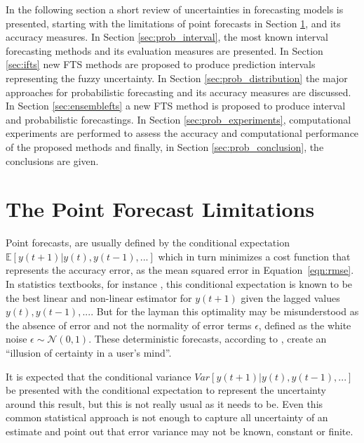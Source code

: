 In the following section a short review of uncertainties in forecasting models is presented, starting with the limitations of point forecasts in Section \ref{sec:prob_point}, and its accuracy measures. In Section \ref{sec:prob_interval}, the most known interval forecasting methods and its evaluation measures are presented. In Section \ref{sec:ifts} new FTS methods are proposed to produce prediction intervals representing the fuzzy uncertainty. In Section \ref{sec:prob_distribution} the major approaches for probabilistic forecasting and its accuracy measures are discussed. In Section \ref{sec:ensemblefts} a new FTS method is proposed to produce interval and probabilistic forecastings. In Section \ref{sec:prob_experiments}, computational experiments are performed to assess the accuracy and computational performance of the proposed methods and finally, in Section \ref{sec:prob_conclusion}, the conclusions are given. 

%
\section{The Point Forecast Limitations}
\label{sec:prob_point}


Point forecasts, are usually defined by the conditional expectation $\mathbb{E}[y(t+1)|y(t),y(t-1),...]$ which in turn minimizes a cost function that represents the accuracy error, as the mean squared error in Equation~\eqref{eqn:rmse}. In statistics textbooks, for instance \cite{Kay2006}, this conditional expectation is  known to be the best linear and non-linear estimator for $y(t+1)$ given the lagged values $y(t),y(t-1),...$. But for the layman this optimality may be misunderstood as the absence of error and not the normality of error terms $\epsilon$, defined as the white noise $\epsilon \sim \mathcal{N}(0,1)$. These deterministic forecasts, according to \cite{Krzysztofowicz2001}, create an ``illusion of certainty in a user's mind''. 

It is expected that the conditional variance $Var[y(t+1)|y(t),y(t-1),...]$ be presented with the conditional expectation to represent the uncertainty around this result, but this is not really usual as it needs to be. Even this common statistical approach is not enough to capture all uncertainty of an estimate and \cite{Makridakis2009} point out that error variance may not be known, constant or finite.

